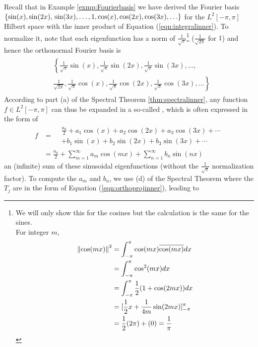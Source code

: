 Recall that in Example \ref{exmp:Fourierbasis} we have derived the Fourier basis $\{\sin(x), \sin(2x), \\ \sin(3x), \ldots, 1, \cos(x), \cos(2x), \cos(3x), \ldots\}$ for the $L^2[-\pi, \pi]$ Hilbert space with the inner product of Equation (\ref{eqn:integralinner}). To normalize it, note that each eigenfunction has a norm of $\frac{1}{\sqrt{\pi}}$\footnote{We will only show this for the cosines but the calculation is the same for the sines. \\For integer $m$,
\begin{align*}
\norm{\cos(mx)}^2 &= \int_{-\pi}^{\pi} \cos(mx)\overline{\cos(mx)} dx \\
&= \int_{-\pi}^{\pi} \cos^2(mx) dx \\
&= \int_{-\pi}^{\pi} \frac{1}{2}(1 + \cos(2mx)) dx \\
&= [\frac{1}{2}x + \frac{1}{4m}\sin(2mx)]_{-\pi}^{\pi} \\
&= \frac{1}{2}(2\pi) + (0) = \frac{1}{\pi}
\end{align*}
} ($\frac{1}{\sqrt{2\pi}}$ for $1$) and hence the orthonormal Fourier basis is 
\begin{align}
\begin{aligned}
&\left\{\frac{1}{\sqrt{\pi}}\sin(x), \frac{1}{\sqrt{\pi}}\sin(2x), \frac{1}{\sqrt{\pi}}\sin(3x), \ldots,\right. \\
&\left.\frac{1}{\sqrt{2\pi}}, \frac{1}{\sqrt{\pi}}\cos(x), \frac{1}{\sqrt{\pi}}\cos(2x), \frac{1}{\sqrt{\pi}}\cos(3x), \ldots\right\} 
\end{aligned}
\end{align} According to part (a) of the Spectral Theorem \ref{thm:spectralinner}, any function $f \in L^2[-\pi, \pi]$ can thus be expanded in a so-called , which is often expressed in the form of
\begin{subequations}
 \label{eqn:fourierseries}
\begin{align}
f &= 
\begin{aligned}
&\frac{a_0}{2} + a_1\cos(x) + a_2\cos(2x) + a_3\cos(3x) + \cdots \\
& + b_1\sin(x) + b_2\sin(2x) + b_3\sin(3x) + \cdots 
\end{aligned}\\
&= \frac{a_0}{2} + \sum_{m=1}^{\infty} a_m \cos(mx) + \sum_{n=1}^{\infty} b_n \sin(nx) 
\end{align}
\end{subequations}
an (infinite) sum of these sinusoidal eigenfunctions (without the $\frac{1}{\sqrt{\pi}}$ normalization factor). To compute the  $a_m$ and $b_n$, we use (d) of the Spectral Theorem where the $T_j$ are in the form of Equation (\ref{eqn:orthoprojinner}), leading to
